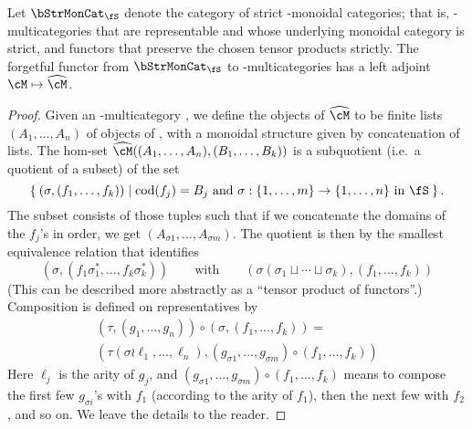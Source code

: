 \begin{thm}\label{thm:free-Smoncat-Smulti}
  Let $\bStrMonCat_\fS$ denote the category of strict \fS-monoidal categories; that is, \fS-multicategories that are representable and whose underlying monoidal category is strict, and functors that preserve the chosen tensor products strictly.
  The forgetful functor from $\bStrMonCat_\fS$ to \fS-multicategories has a left adjoint $\cM\mapsto\catctx\cM$.
\end{thm}
\begin{proof}
  Given an \fS-multicategory \cM, we define the objects of $\catctx\cM$ to be finite lists $(A_1,\dots,A_n)$ of objects of \cM, with a monoidal structure given by concatenation of lists.
  The hom-set $\catctx\cM((A_1,\dots,A_n),(B_1,\dots,B_k))$ is a subquotient (i.e.\ a quotient of a subset) of the set
  \[ \setof{(\sigma,(f_1,\dots,f_k)) | \cod(f_j) = B_j \text{ and } \sigma : \{1,\dots,m\} \to \{1,\dots,n\}\text{ in }\fS }. \]
  The subset consists of those tuples such that if we concatenate the domains of the $f_j$'s in order, we get $(A_{\sigma 1},\dots, A_{\sigma m})$.
  The quotient is then
  by the smallest equivalence relation that identifies
  \[ (\sigma, (f_1 \sigma_1^* ,\dots, f_k \sigma_k^*))
  \qquad\text{with}\qquad
  (\sigma(\sigma_1\sqcup \cdots \sqcup \sigma_k),(f_1,\dots,f_k))\]
  (This can be described more abstractly as a ``tensor product of functors''.)
  Composition is defined on representatives by
  \begin{multline*}
    (\tau,(g_1,\dots,g_n)) \circ (\sigma,(f_1,\dots,f_k)) =\\
    (\tau(\sigma\wr \ell_1,\dots,\ell_n), (g_{\sigma 1},\dots,g_{\sigma m})\circ (f_1,\dots,f_k))
  \end{multline*}
  Here $\ell_j$ is the arity of $g_j$, and $(g_{\sigma 1},\dots,g_{\sigma m})\circ (f_1,\dots,f_k)$ means to compose the first few $g_{\sigma i}$'s with $f_1$ (according to the arity of $f_1$), then the next few with $f_2$, and so on.
  We leave the details to the reader.


\end{proof}
